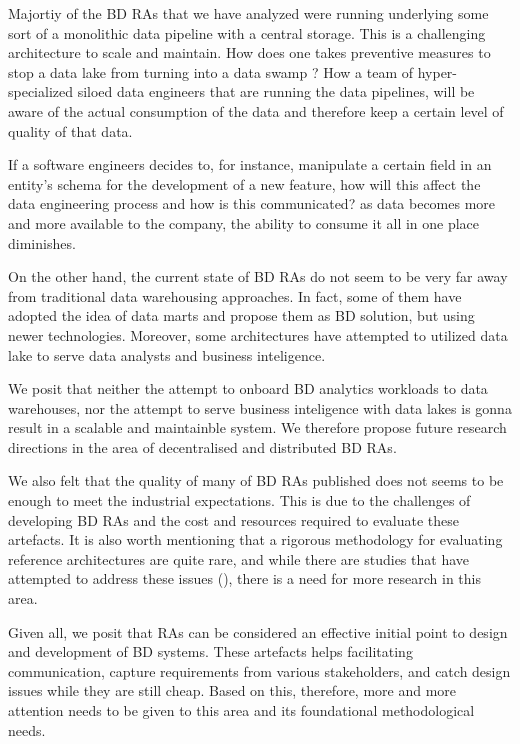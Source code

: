 \documentclass[review]{elsarticle}
\begin{document}
Majortiy of the BD RAs that we have analyzed were running underlying some sort of a monolithic data pipeline with a central storage. This is a challenging architecture to scale and maintain. How does one takes preventive measures to stop a data lake from turning into a data swamp ? How a team of hyper-specialized siloed data engineers that are running the data pipelines, will be aware of the actual consumption of the data and therefore keep a certain level of quality of that data.

If a software engineers decides to, for instance, manipulate a certain field in an entity's schema for the development of a new feature, how will this affect the data engineering process and how is this communicated? as data becomes more and more available to the company, the ability to consume it all in one place diminishes. 

On the other hand, the current state of BD RAs do not seem to be very far away from traditional data warehousing approaches. In fact, some of them have adopted the idea of data marts and propose them as BD solution, but using newer technologies. Moreover, some architectures have attempted to utilized data lake to serve data analysts and business inteligence. 

We posit that neither the attempt to onboard BD analytics workloads to data warehouses, nor the attempt to serve business inteligence with data lakes is gonna result in a scalable and maintainble system. We therefore propose future research directions in the area of decentralised and distributed BD RAs. 

We also felt that the quality of many of BD RAs published does not seems to be enough to meet the industrial expectations. This is due to the challenges of developing BD RAs and the cost and resources required to evaluate these artefacts. It is also worth mentioning that a rigorous methodology for evaluating reference architectures are quite rare, and while there are studies that have attempted to address these issues (\cite{angelov2008towards}), there is a need for more research in this area.

Given all, we posit that RAs can be considered an effective initial point to design and development of BD systems. These artefacts helps facilitating communication, capture requirements from various stakeholders, and catch design issues while they are still cheap. Based on this, therefore, more and more attention needs to be given to this area and its foundational methodological needs. 
\end{document}

